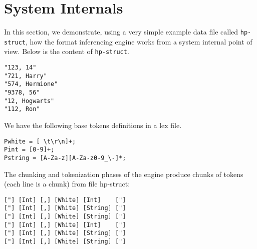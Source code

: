 \documentclass{sig-alternate-sigmod08}
\begin{document}
\begin {figure*}[tbh]
\begin{center}
\begin{minipage}[t]{0.5\columnwidth} 
\end{minipage}
\hfill
\begin{minipage}[t]{0.5\columnwidth}
\end{minipage}
\hfill
\begin{minipage}[t]{0.5\columnwidth}
\end{minipage}
\hfill
\begin{minipage}[t]{0.5\columnwidth}
\end{minipage}
\caption{Histograms from inferring hp-struct data (from left to right): 
(a) first iteration, (b) second iteration, (c) third iteration (context 1) 
and (d) third iteration (context 2)} \label{fig-hist}
\vspace*{-5mm}
\end{center}
\end{figure*}

\section{System Internals}
In this section, we demonstrate, using a very simple
example data file called {\tt hp-struct}, 
how the format inferencing engine works
from a system internal point of view.
Below is the content of {\tt hp-struct}.
{\small
\begin{verbatim}
"123, 14"
"721, Harry"
"574, Hermione"
"9378, 56"
"12, Hogwarts"
"112, Ron"
\end{verbatim}
}

We have the following base tokens definitions in a lex file. 

{\small
\begin{verbatim}
Pwhite = [ \t\r\n]+;
Pint = [0-9]+;
Pstring = [A-Za-z][A-Za-z0-9_\-]*;
\end{verbatim}
}

The chunking and tokenization phases of the engine produce
chunks of tokens (each line is a chunk) from file hp-struct:
{\small
\begin{verbatim}
["] [Int] [,] [White] [Int]    ["]
["] [Int] [,] [White] [String] ["]
["] [Int] [,] [White] [String] ["]
["] [Int] [,] [White] [Int]    ["]
["] [Int] [,] [White] [String] ["]
["] [Int] [,] [White] [String] ["]
\end{verbatim}
}
\end{document}
